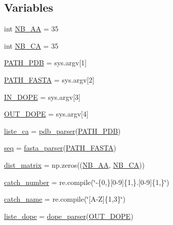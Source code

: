 \subsection*{Variables}
\begin{DoxyCompactItemize}
\item 
int \hyperlink{namespacedp_a96406242870c67c020a33658fcb9b82b}{N\+B\+\_\+\+AA} = 35
\item 
int \hyperlink{namespacedp_adf55946f89f4c0fc8fef731a735393ed}{N\+B\+\_\+\+CA} = 35
\item 
\hyperlink{namespacedp_a4a8cc3b163ef705fcc7e22164e1d853b}{P\+A\+T\+H\+\_\+\+P\+DB} = sys.\+argv\mbox{[}1\mbox{]}
\item 
\hyperlink{namespacedp_ab5681a4f480102975735e8f611b3e416}{P\+A\+T\+H\+\_\+\+F\+A\+S\+TA} = sys.\+argv\mbox{[}2\mbox{]}
\item 
\hyperlink{namespacedp_aacf1b000f9c49b46ee694751ae77dceb}{I\+N\+\_\+\+D\+O\+PE} = sys.\+argv\mbox{[}3\mbox{]}
\item 
\hyperlink{namespacedp_a055c79df05104c6fb6b2d71d14f33f2e}{O\+U\+T\+\_\+\+D\+O\+PE} = sys.\+argv\mbox{[}4\mbox{]}
\item 
\hyperlink{namespacedp_ae299bf173b08073dea4a36c55212f3d5}{liste\+\_\+ca} = \hyperlink{namespacedp_a2efc9e97f366bbb035bcfb64e2c1d586}{pdb\+\_\+parser}(\hyperlink{namespacedp_a4a8cc3b163ef705fcc7e22164e1d853b}{P\+A\+T\+H\+\_\+\+P\+DB})
\item 
\hyperlink{namespacedp_a60635934dcb82b1c274e6cceab216700}{seq} = \hyperlink{namespacedp_a18f65f051a1b44c4c4f29a1084a1e2b5}{fasta\+\_\+parser}(\hyperlink{namespacedp_ab5681a4f480102975735e8f611b3e416}{P\+A\+T\+H\+\_\+\+F\+A\+S\+TA})
\item 
\hyperlink{namespacedp_ac12fa4ce0fe851989027b7dbb12fa1c5}{dist\+\_\+matrix} = np.\+zeros((\hyperlink{namespacedp_a96406242870c67c020a33658fcb9b82b}{N\+B\+\_\+\+AA}, \hyperlink{namespacedp_adf55946f89f4c0fc8fef731a735393ed}{N\+B\+\_\+\+CA}))
\item 
\hyperlink{namespacedp_a18cc131ff5220f66fa5cf95066d82ed5}{catch\+\_\+number} = re.\+compile(\char`\"{}-\/\{0,\}\mbox{[}0-\/9\mbox{]}\{1,\}.\mbox{[}0-\/9\mbox{]}\{1,\}\char`\"{})
\item 
\hyperlink{namespacedp_aff02c78936c69d1c43ce85271bb6324c}{catch\+\_\+name} = re.\+compile(\char`\"{}\mbox{[}A-\/Z\mbox{]}\{1,3\}\char`\"{})
\item 
\hyperlink{namespacedp_a73f0f6fe49c927039bc37d60141be62a}{liste\+\_\+dope} = \hyperlink{namespacedp_ae89d77b1b40672307f39db4453a7861a}{dope\+\_\+parser}(\hyperlink{namespacedp_a055c79df05104c6fb6b2d71d14f33f2e}{O\+U\+T\+\_\+\+D\+O\+PE})

\end{DoxyCompactItemize}

